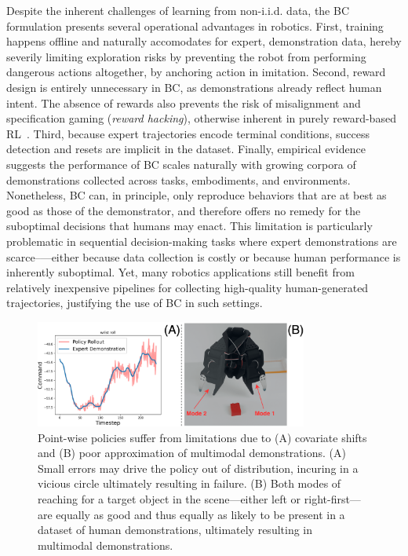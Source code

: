 Despite the inherent challenges of learning from non-i.i.d. data, the BC formulation presents several operational advantages in robotics.
First, training happens offline and naturally accomodates for expert, demonstration data, hereby severily limiting exploration risks by preventing the robot from performing dangerous actions altogether, by anchoring action in imitation.
Second, reward design is entirely unnecessary in BC, as demonstrations already reflect human intent.
The absence of rewards also prevents the risk of misalignment and specification gaming (\emph{reward hacking}), otherwise inherent in purely reward-based RL~\citep{heessEmergenceLocomotionBehaviours2017}.
Third, because expert trajectories encode terminal conditions, success detection and resets are implicit in the dataset.
Finally, empirical evidence suggests the performance of BC scales naturally with growing corpora of demonstrations collected across tasks, embodiments, and environments.
Nonetheless, BC can, in principle, only reproduce behaviors that are at best as good as those of the demonstrator, and therefore offers no remedy for the suboptimal decisions that humans may enact.
This limitation is particularly problematic in sequential decision-making tasks where expert demonstrations are scarce--—either because data collection is costly or because human performance is inherently suboptimal. 
Yet, many robotics applications still benefit from relatively inexpensive pipelines for collecting high-quality human-generated trajectories, justifying the use of BC in such settings.

\begin{figure}
    \centering
    \includegraphics[width=0.8\textwidth]{figures/ch4/ch4-issues-with-bc.png}
    \caption{Point-wise policies suffer from limitations due to (A) covariate shifts and (B) poor approximation of multimodal demonstrations. (A) Small errors may drive the policy out of distribution, incuring in a vicious circle ultimately resulting in failure. (B) Both modes of reaching for a target object in the scene---either left or right-first---are equally as good and thus equally as likely to be present in a dataset of human demonstrations, ultimately resulting in multimodal demonstrations.}
    \label{fig:ch4-issues-with-bc}
\end{figure}

